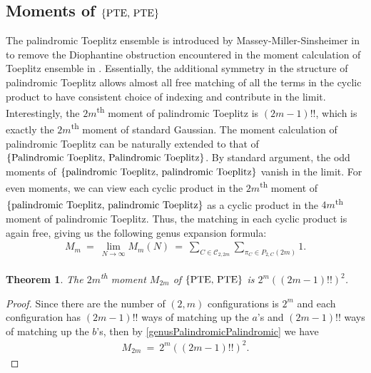 \documentclass[11pt,reqno]{amsart}
\numberwithin{equation}{section}
\theoremstyle{plain}
\newtheorem{theorem}[thm]{Theorem}
\begin{document}
\subsection{Moments of $\{\textup{PTE, PTE}\}$}\label{momentsPTPT} The palindromic Toeplitz ensemble is introduced by Massey-Miller-Sinsheimer in \cite{palindromicToeplitz} to remove the Diophantine obstruction encountered in the moment calculation of Toeplitz ensemble in \cite{Toeplitz}. Essentially, the additional symmetry in the structure of palindromic Toeplitz allows almost all free matching of all the terms in the cyclic product to have consistent choice of indexing and contribute in the limit. Interestingly, the $2m$\textsuperscript{th} moment of palindromic Toeplitz is $(2m-1)!!$, which is exactly the $2m$\textsuperscript{th} moment of standard Gaussian. The moment calculation of palindromic Toeplitz can be naturally extended to that of $\{\textup{Palindromic Toeplitz, Palindromic Toeplitz}\}$. By standard argument, the odd moments of $\{\textup{palindromic Toeplitz, palindromic Toeplitz}\}$ vanish in the limit. For even moments, we can view each cyclic product in the $2m$\textsuperscript{th} moment of $\{\textup{palindromic Toeplitz, palindromic Toeplitz}\}$ as a cyclic product in the $4m$\textsuperscript{th} moment of palindromic Toeplitz. Thus, the matching in each cyclic product is again free, giving us the following genus expansion formula:
\begin{align}\label{genusPalindromicPalindromic}
M_m \ = \ \lim_{N\rightarrow \infty}M_m(N) \ = \ \sum_{C\in\mathcal{C}_{2,2m}}\sum_{\pi_C\in P_{2,C}(2m)}1.
\end{align}

\begin{theorem}
The $2m$\textsuperscript{th} moment $M_{2m}$ of $\{\textup{PTE, PTE}\}$ is $2^m((2m-1)!!)^2$.
\end{theorem}
\begin{proof}
Since there are the number of $(2, m)$ configurations is $2^m$ and each configuration has $(2m-1)!!$ ways of matching up the $a$'s and $(2m-1)!!$ ways of matching up the $b$'s, then by \eqref{genusPalindromicPalindromic} we have
\begin{align}
M_{2m} \ = \ 2^m((2m-1)!!)^2.
\end{align}
\end{proof}

\end{document}
